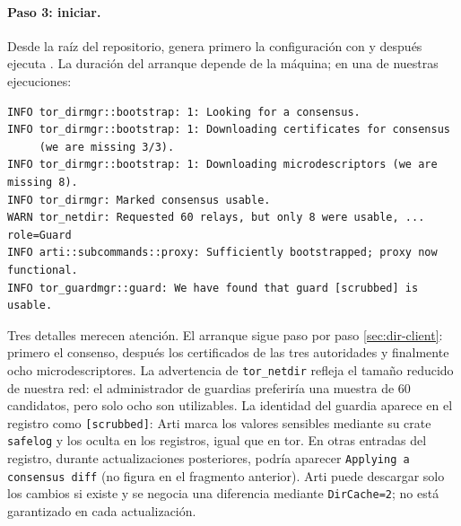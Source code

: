 \paragraph{Paso 3: iniciar.} Desde la raíz del repositorio, genera primero la configuración con  y después ejecuta . La duración del arranque depende de la máquina; en una de nuestras ejecuciones:
\begin{lstlisting}[numbers=none]
INFO tor_dirmgr::bootstrap: 1: Looking for a consensus.
INFO tor_dirmgr::bootstrap: 1: Downloading certificates for consensus
     (we are missing 3/3).
INFO tor_dirmgr::bootstrap: 1: Downloading microdescriptors (we are missing 8).
INFO tor_dirmgr: Marked consensus usable.
WARN tor_netdir: Requested 60 relays, but only 8 were usable, ...  role=Guard
INFO arti::subcommands::proxy: Sufficiently bootstrapped; proxy now functional.
INFO tor_guardmgr::guard: We have found that guard [scrubbed] is usable.
\end{lstlisting}
Tres detalles merecen atención. El arranque sigue paso por paso \cref{sec:dir-client}: primero el consenso, después los certificados de las tres autoridades y finalmente ocho microdescriptores. La advertencia de \texttt{tor\_netdir} refleja el tamaño reducido de nuestra red: el administrador de guardias preferiría una muestra de 60 candidatos, pero solo ocho son utilizables. La identidad del guardia aparece en el registro como \texttt{[scrubbed]}: Arti marca los valores sensibles mediante su crate \texttt{safelog} y los oculta en los registros, igual que  en tor. En otras entradas del registro, durante actualizaciones posteriores, podría aparecer \texttt{Applying a consensus diff} (no figura en el fragmento anterior). Arti puede descargar solo los cambios si existe y se negocia una diferencia mediante \texttt{DirCache=2}; no está garantizado en cada actualización.

